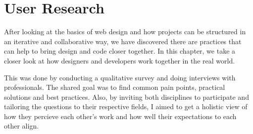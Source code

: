 \newpage
\section{User Research}
After looking at the basics of web design and how projects can be structured in an iterative and
collaborative way, we have discovered there are practices that can help to bring design and code
closer together. In this chapter, we take a closer look at how designers and developers work
together in the real world. 

This was done by conducting a qualitative survey and doing interviews with professionals. The shared
goal was to find common pain points, practical solutions and best practices. Also, by inviting both
disciplines to participate and tailoring the questions to their respective fields, I aimed to get a
holistic view of how they percieve each other's work and how well their expectations to each other
align.




